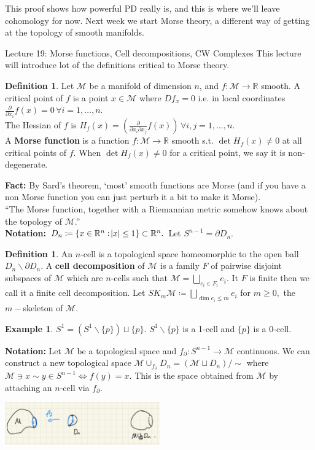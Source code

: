 \documentclass[10pt]{article}
\theoremstyle{plain}
\theoremstyle{definition}
\newtheorem{defn}[thm]{Definition} %
\newtheorem{exmp}[thm]{Example} %
\newcommand{\Notation}{\textbf{Notation: }}
\newcommand{\Fact}{\textbf{Fact: }}
\newcommand{\Real}{\mathbb{R}}
\newcommand{\man}{\mathcal{M}}
\newcommand{\parderiv}[1]{\frac{\partial}{\partial {#1}}}
\begin{document}
This proof shows how powerful PD really is, and this is where we'll leave cohomology for now. Next week we start Morse theory, a different way of getting at the topology of smooth manifolds.



\begin{section}{Lecture 19: Morse functions, Cell decompositions, CW Complexes}
This lecture will introduce lot of the definitions critical to Morse theory.

\begin{defn}\label{defn:MorseFunction}
    Let $\man$ be a manifold of dimension $n$, and $f:\man \to \Real$ smooth. A critical point of $f$ is a point $x\in \man$ where $Df_x = 0$ i.e. in local coordinates $\parderiv{x_i}f(x)=0\, \forall i = 1,\ldots,n.$\\
    The Hessian of $f$ is $H_f(x) = \left(\parderiv{x_i\partial x_j} f(x)\right) \, \forall i,j=1,\ldots,n$.\\
    A \textbf{Morse function} is a function $f : \man \to \Real$ smooth s.t. $\det H_f(x) \neq 0$ at all critical points of $f$. When $\det H_f(x) \neq 0$ for a critical point, we say it is non-degenerate. 
\end{defn}
\Fact By Sard's theorem, `most' smooth functions are Morse (and if you have a non Morse function you can just perturb it a bit to make it Morse).\\
``The Morse function, together with a Riemannian metric somehow knows about the topology of $\man$.''\\
\Notation $D_n \coloneqq \{ x \in \Real^n : \abs{x} \leq 1 \} \subset \Real^n.$ Let $S^{n-1} = \partial D_n$.
\begin{defn}
    An $n$-cell is a topological space homeomorphic to the open ball $D_n \backslash \partial D_n$. A \textbf{cell decomposition} of $\man$ is a family $F$ of pairwise disjoint subspaces of $\man$ which are $n$-cells such that $\man = \bigsqcup \limits_{e_i \in F_i} e_i$. It $F$ is finite then we call it a  finite cell decomposition. Let $SK_m \man \coloneqq \bigsqcup \limits_{\dim e_i \leq m}e_i$ for $m\geq 0,$ the $m-$skeleton of $\man$.
\end{defn}

\begin{exmp}
     $S^1 = (S^1\backslash\{p\})\sqcup\{p\}$. $S^1\backslash\{p\}$ is a 1-cell and $\{p\}$ is a 0-cell.
\end{exmp}

\Notation Let $\man$ be a topological space and $f_\partial : S^{n-1} \to \man$ continuous. We can construct a new topological space $\man \cup_{f_\partial} D_n = (\man \sqcup D_n)/\sim$ where $\man \ni x \sim y\in S^{n-1} \iff f(y) = x$. This is the space obtained from $\man$ by attaching an $n$-cell via $f_\partial.$
\begin{center}
    \includegraphics[width = 0.5\textwidth]{AttachingMap.png}
\end{center} 


\end{section}
\end{document}
